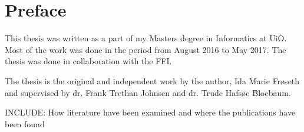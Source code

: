 \chapter*{Preface}                    %
This thesis was written as a part of my Masters degree in Informatics at UiO. Most of the work was done in the period from August 2016 to May 2017. The thesis was done in collaboration with the FFI. 


The thesis is the original and independent work by the author, Ida Marie Fr{\o}seth and supervised by dr. Frank Trethan Johnsen and dr. Trude Hafs{\o}e Bloebaum. 


INCLUDE: How literature have been examined and where the publications have been found
